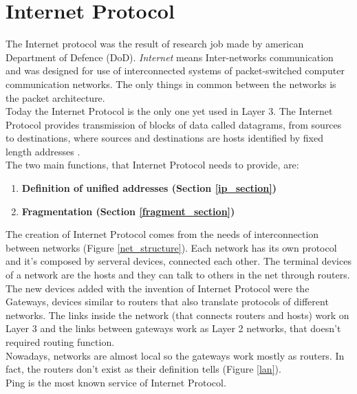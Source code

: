 \chapter{Internet Protocol}\label{layer3}
The Internet protocol was the result of research job made by american Department of Defence (DoD). \textit{Internet} means Inter-networks communication and was designed for use of interconnected systems of packet-switched computer communication networks. The only things in common between the networks is the packet architecture.\\
Today the Internet Protocol is the only one yet used in Layer 3. The Internet Protocol provides transmission of blocks of data called datagrams, from sources to destinations, where sources and destinations are hosts identified by fixed length addresses \cite{RFC791}.\\
The two main functions, that Internet Protocol needs to provide, are:
\begin{enumerate}
\item{\textbf{Definition of unified addresses (Section \ref{ip_section})}}
\item{\textbf{Fragmentation (Section \ref{fragment_section})}}
\end{enumerate}
The creation of Internet Protocol comes from the needs of interconnection between networks (Figure \ref{net_structure}). Each network has its own protocol and it's composed by serveral devices, connected each other. The terminal devices of a network are the hosts and they can talk to others in the net through routers.\\
The new devices added with the invention of Internet Protocol were the Gateways, devices similar to routers that also translate protocols of different networks. The links inside the network (that connects routers and hosts) work on Layer 3 and the links between gateways work as Layer 2 networks, that doesn't required routing function.\\
Nowadays, networks are almost local so the gateways work mostly as routers. In fact, the routers don't exist as their definition tells (Figure \ref{lan}).\\
Ping is the most known service of Internet Protocol.
